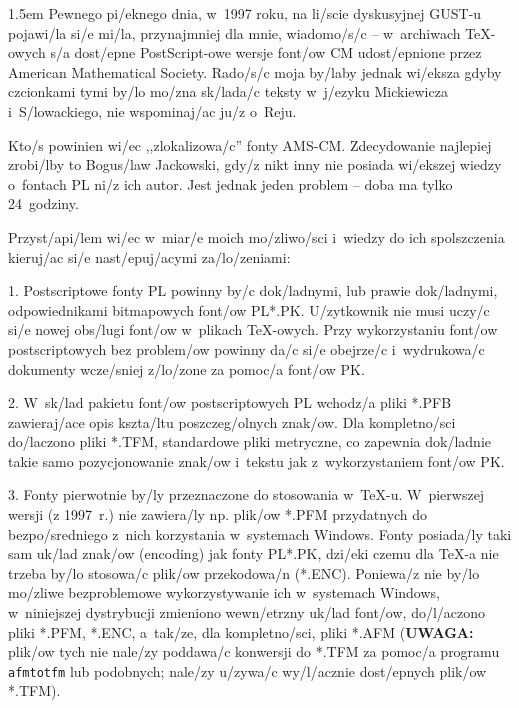 {\baselineskip 13pt \parindent 1.5em \parskip3pt
\noindent Pewnego pi/eknego dnia, w~1997 roku, na li/scie
dyskusyjnej GUST-u pojawi/la si/e mi/la, przynajmniej dla mnie, wiadomo/s/c
-- w~archiwach \TeX-owych s/a dost/epne PostScript-owe wersje font/ow CM
udost/epnione przez American Mathematical Society. Rado/s/c moja by/laby
jednak wi/eksza gdyby czcionkami tymi by/lo mo/zna sk/lada/c teksty w~j/ezyku
Mickiewicza i~S/lowackiego, nie wspominaj/ac ju/z o~Reju.

Kto/s powinien wi/ec ,,zlokalizowa/c'' fonty AMS-CM. Zdecydowanie najlepiej
zrobi/lby to Bogus/law Jackowski, gdy/z nikt inny nie posiada wi/ekszej
wiedzy o~fontach PL ni/z ich autor. Jest jednak jeden problem -- doba ma
tylko 24~godziny.

Przyst/api/lem wi/ec w~miar/e moich mo/zliwo/sci i~wiedzy do ich spolszczenia
kieruj/ac si/e nast/epuj/acymi za/lo/zeniami:

\item{1.} Postscriptowe fonty PL powinny by/c dok/ladnymi, lub prawie
dok/ladnymi, odpowiednikami bitmapowych font/ow PL*.PK. U/zytkownik nie musi
uczy/c si/e nowej obs/lugi font/ow w~plikach \TeX-owych. Przy wykorzystaniu
font/ow postscriptowych bez problem/ow powinny da/c si/e obejrze/c
i~wydrukowa/c dokumenty wcze/sniej z/lo/zone za pomoc/a font/ow PK.

\item{2.} W~sk/lad pakietu font/ow postscriptowych PL wchodz/a
pliki *.PFB zawieraj/ace opis kszta/ltu poszczeg/olnych znak/ow. Dla
kompletno/sci do/laczono pliki *.TFM, standardowe pliki metryczne,
co zapewnia dok/ladnie takie samo pozycjonowanie znak/ow i~tekstu jak
z~wykorzystaniem font/ow PK.

\item{3.} Fonty pierwotnie by/ly przeznaczone do stosowania w~\TeX-u.
W~pierwszej wersji (z 1997~r.) nie zawiera/ly np. plik/ow *.PFM przydatnych 
do bezpo/sredniego z~nich korzystania w~systemach Windows. Fonty posiada/ly
taki sam uk/lad znak/ow (encoding) jak fonty PL*.PK, dzi/eki czemu dla \TeX-a
nie trzeba by/lo stosowa/c plik/ow przekodowa/n (*.ENC).  Poniewa/z nie by/lo
mo/zliwe bezproblemowe wykorzystywanie ich w~systemach Windows, w~niniejszej
dystrybucji zmieniono wewn/etrzny uk/lad font/ow, do/l/aczono pliki *.PFM, 
*.ENC, a~tak/ze, dla kompletno/sci, pliki *.AFM ({\bf UWAGA:} plik/ow tych 
nie nale/zy poddawa/c konwersji do *.TFM za pomoc/a programu {\tt afmtotfm} 
lub podobnych; nale/zy u/zywa/c wy/l/acznie dost/epnych plik/ow *.TFM).

}
